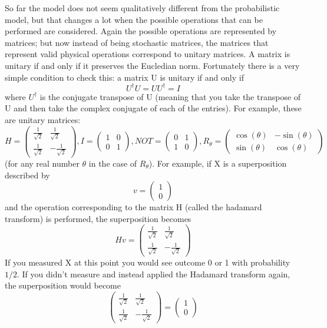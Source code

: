 \documentclass[12pt, oneside]{book}
\theoremstyle{definition}
\theoremstyle{definition}
\theoremstyle{remark}
\begin{document}
So far the model does not seem qualitatively different from the probabilistic model, but that changes a lot when the possible operations that can be performed are considered. Again the possible operations are represented by matrices; but now instead of being stochastic matrices, the matrices that represent valid physical operations correspond to unitary matrices. A matrix is unitary if and only if it preserves the Eucledian norm. Fortunately there is a very simple condition to check this: a matrix U is unitary if and only if
\[
U^{\dagger}U=UU^{\dagger}=I
\]
where $U^{\dagger}$ is the conjugate transpose of U (meaning that you take the transpose of U and then take the complex conjugate of each of the entries). For example, these are unitary matrices:
\[
H=\begin{pmatrix} \frac{1}{\sqrt{2}} & \frac{1}{\sqrt{2}} \\ \frac{1}{\sqrt{2}} & -\frac{1}{\sqrt{2}} \end{pmatrix}, I=\begin{pmatrix} 1 & 0 \\0 & 1 \end{pmatrix}, NOT=\begin{pmatrix} 0 & 1 \\ 1 & 0\end{pmatrix}, R_{\theta} = \begin{pmatrix} \cos (\theta) & -\sin (\theta) \\ \sin(\theta) & \cos (\theta) \end{pmatrix}
\]
(for any real number $\theta$ in the case of $R_{\theta}$). For example, if X is a superposition described by
\[
v=\begin{pmatrix} 1 \\ 0 \end{pmatrix}
\]
and the operation corresponding to the matrix H (called the hadamard transform) is performed, the superposition becomes
\[
Hv=\begin{pmatrix} \frac{1}{\sqrt{2}} & \frac{1}{\sqrt{2}}\\\frac{1}{\sqrt{2}} & -\frac{1}{\sqrt{2}} \end{pmatrix}
\]
If you measured X at this point you would see outcome 0 or 1 with probability $1/2$. If you didn't measure and instead applied the Hadamard transform again, the superposition would become
\[
\begin{pmatrix} \frac{1}{\sqrt{2}} & \frac{1}{\sqrt{2}} \\ \frac{1}{\sqrt{2}} & -\frac{1}{\sqrt{2}} \end{pmatrix} = \begin{pmatrix} 1 \\ 0 \end{pmatrix}
\]
\end{document}
